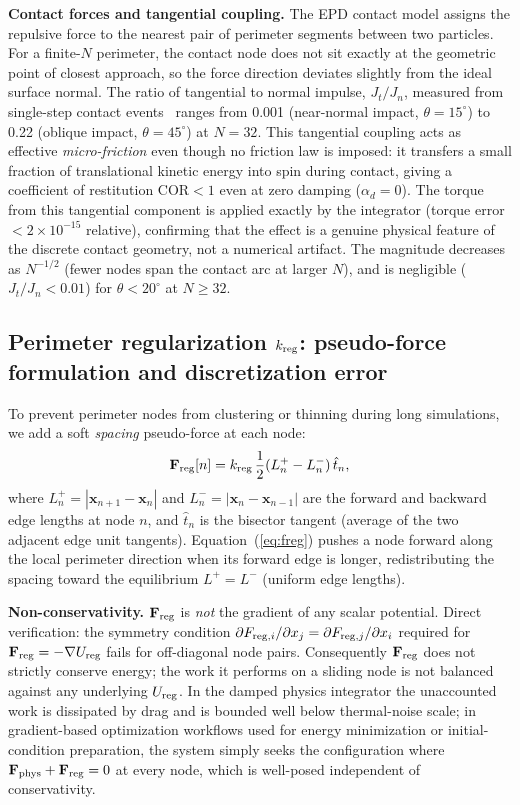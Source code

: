 \documentclass[aps,pre,twocolumn,floatfix,longbibliography]{revtex4-2}
\begin{document}
\textbf{Contact forces and tangential coupling.}
The EPD contact model assigns the repulsive force to the nearest pair of
perimeter segments between two particles.  For a finite-$N$ perimeter, the
contact node does not sit exactly at the geometric point of closest approach,
so the force direction deviates slightly from the ideal surface normal.  The
ratio of tangential to normal impulse, $J_t/J_n$, measured from single-step
contact events~\cite{contactforce_code} ranges from 0.001 (near-normal impact,
$\theta = 15^\circ$) to 0.22 (oblique impact, $\theta = 45^\circ$) at $N = 32$.
This tangential coupling acts as effective \emph{micro-friction} even though
no friction law is imposed: it transfers a small fraction of translational
kinetic energy into spin during contact, giving a coefficient of restitution
$\text{COR} < 1$ even at zero damping ($\alpha_d = 0$).  The torque from
this tangential component is applied exactly by the integrator (torque error
$< 2 \times 10^{-15}$ relative), confirming that the effect is a genuine
physical feature of the discrete contact geometry, not a numerical artifact.
The magnitude decreases as $N^{-1/2}$ (fewer nodes span the contact arc at
larger $N$), and is negligible ($J_t/J_n < 0.01$) for $\theta < 20^\circ$
at $N \geq 32$.

\subsection{Perimeter regularization $k_{\rm reg}$: pseudo-force formulation
and discretization error}
\label{sec:kreg}

To prevent perimeter nodes from clustering or thinning during long
simulations, we add a soft \emph{spacing} pseudo-force at each node:
\begin{equation}
  \mathbf{F}_{\rm reg}[n] = k_{\rm reg}\,\frac{1}{2}(L^+_n - L^-_n)\,\hat{t}_n,
\label{eq:freg}
\end{equation}
where $L^+_n = |\mathbf{x}_{n+1} - \mathbf{x}_n|$ and
$L^-_n = |\mathbf{x}_n - \mathbf{x}_{n-1}|$ are the forward and backward
edge lengths at node $n$, and $\hat{t}_n$ is the bisector tangent
(average of the two adjacent edge unit tangents). Equation~(\ref{eq:freg})
pushes a node forward along the local perimeter direction when its
forward edge is longer, redistributing the spacing toward the equilibrium
$L^+ = L^-$ (uniform edge lengths).

\textbf{Non-conservativity.}
$\mathbf{F}_{\rm reg}$ is \emph{not} the gradient of any scalar potential.
Direct verification: the symmetry condition
$\partial F_{{\rm reg},i}/\partial x_j = \partial F_{{\rm reg},j}/\partial x_i$
required for $\mathbf{F}_{\rm reg} = -\nabla U_{\rm reg}$ fails for off-diagonal
node pairs. Consequently $\mathbf{F}_{\rm reg}$ does not strictly conserve
energy; the work it performs on a sliding node is not balanced against any
underlying $U_{\rm reg}$. In the damped physics integrator the
unaccounted work is dissipated by drag and is bounded well below
thermal-noise scale; in gradient-based optimization workflows used for
energy minimization or initial-condition preparation, the system simply
seeks the configuration where
$\mathbf{F}_{\rm phys} + \mathbf{F}_{\rm reg} = 0$ at every node, which
is well-posed independent of conservativity.
\end{document}
